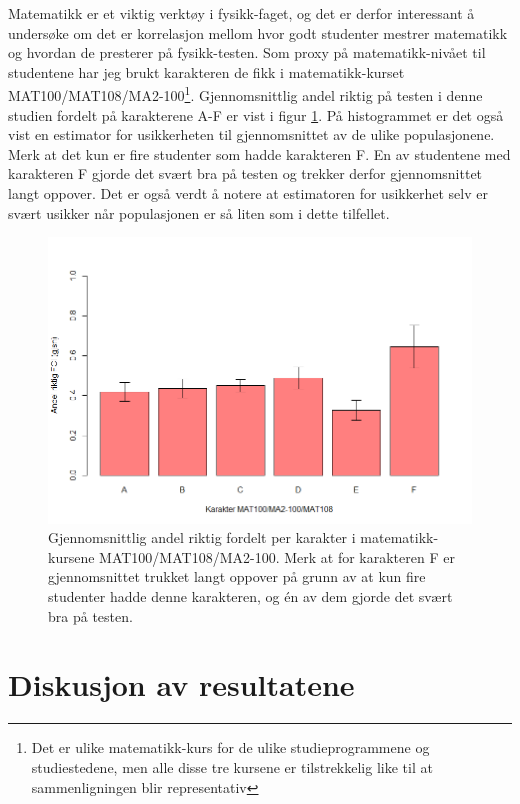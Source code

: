 \documentclass[a4paper,norsk,12pt]{article}
\begin{document}
Matematikk er et viktig verktøy i fysikk-faget, og det er derfor interessant å undersøke om det er korrelasjon mellom hvor godt studenter mestrer matematikk og hvordan de presterer på fysikk-testen. Som proxy på matematikk-nivået til studentene har jeg brukt karakteren de fikk i matematikk-kurset MAT100/MAT108/MA2-100\footnote{Det er ulike matematikk-kurs for de ulike studieprogrammene og studiestedene, men alle disse tre kursene er tilstrekkelig like til at sammenligningen blir representativ}. Gjennomsnittlig andel riktig på testen i denne studien fordelt på karakterene A-F er vist i figur \ref{fig:mat100}. På histogrammet er det også vist en estimator for usikkerheten til gjennomsnittet av de ulike populasjonene. Merk at det kun er fire studenter som hadde karakteren F. En av studentene med karakteren F gjorde det svært bra på testen og trekker derfor gjennomsnittet langt oppover. Det er også verdt å notere at estimatoren for usikkerhet selv er svært usikker når populasjonen er så liten som i dette tilfellet.
\begin{figure}[p]
\begin{center}
	\includegraphics[width=.48\textwidth]{./mat100}
\end{center}
	\caption{Gjennomsnittlig andel riktig fordelt per karakter i matematikk-kursene MAT100/MAT108/MA2-100. Merk at for karakteren F er gjennomsnittet trukket langt oppover på grunn av at kun fire studenter hadde denne karakteren, og \'en av dem gjorde det svært bra på testen.}
	\label{fig:mat100}
\end{figure}



\section{Diskusjon av resultatene}
\end{document}
